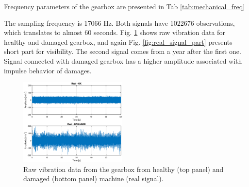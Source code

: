 \documentclass[preprint]{elsarticle}
\begin{document}
Frequency parameters of the gearbox are presented in Tab \ref{tab:mechanical_freq}

\begin{table}[]
    \centering
    \caption{Mechanical frequencies present in the gearbox}
    \label{tab:mechanical_freq}
\end{table}

The sampling frequency is 17066 Hz. Both signals have 1022676 observations, which translates to almost 60 seconds. Fig. \ref{fig:real_signal_all} shows raw vibration data for healthy and damaged gearbox, and again Fig. \ref{fig:real_signal_part} presents short part for visibility. The second signal comes from a year after the first one. Signal connected with damaged gearbox has a higher amplitude associated with impulse behavior of damages.

\begin{figure}[ht!]
\centering
\includegraphics[width=0.48\textwidth]{wykresy/real_signal_all.eps}
\caption{Raw vibration data from the gearbox from healthy (top panel) and damaged (bottom panel) machine (real signal).}
\label{fig:real_signal_all}
\end{figure}
\end{document}
